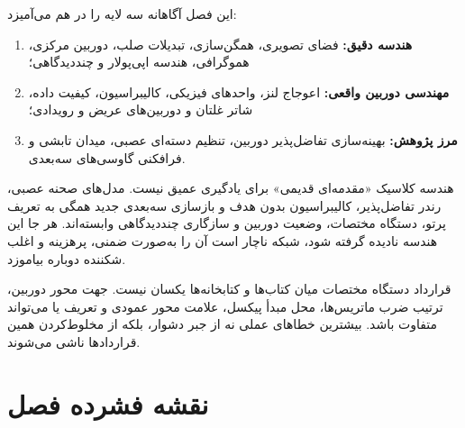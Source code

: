 \documentclass[12pt,openany,oneside]{book}
\begin{document}
این فصل آگاهانه سه لایه را در هم می‌آمیزد:
\begin{enumerate}
\item \textbf{هندسه دقیق:} فضای تصویری، همگن‌سازی، تبدیلات صلب، دوربین مرکزی، هموگرافی، هندسه اپی‌پولار و چنددیدگاهی؛
\item \textbf{مهندسی دوربین واقعی:} اعوجاج لنز، واحدهای فیزیکی، کالیبراسیون، کیفیت داده، شاتر غلتان و دوربین‌های عریض و رویدادی؛
\item \textbf{مرز پژوهش:} بهینه‌سازی تفاضل‌پذیر دوربین، تنظیم دسته‌ای عصبی، میدان تابشی و فرافکنی گاوسی‌های سه‌بعدی.
\end{enumerate}

\begin{keybox}
هندسه کلاسیک «مقدمه‌ای قدیمی» برای یادگیری عمیق نیست. مدل‌های صحنه عصبی، رندر تفاضل‌پذیر، کالیبراسیون بدون هدف و
بازسازی سه‌بعدی جدید همگی به تعریف پرتو، دستگاه مختصات، وضعیت دوربین و سازگاری چنددیدگاهی وابسته‌اند. هر جا این هندسه
نادیده گرفته شود، شبکه ناچار است آن را به‌صورت ضمنی، پرهزینه و اغلب شکننده دوباره بیاموزد.
\end{keybox}

\begin{warningbox}
قرارداد دستگاه مختصات میان کتاب‌ها و کتابخانه‌ها یکسان نیست. جهت محور دوربین، ترتیب ضرب ماتریس‌ها، محل مبدأ پیکسل،
علامت محور عمودی و تعریف  یا  می‌تواند متفاوت باشد. بیشترین خطاهای عملی
نه از جبر دشوار، بلکه از مخلوط‌کردن همین قراردادها ناشی می‌شوند.
\end{warningbox}

\chapter*{نقشه فشرده فصل}
\end{document}
